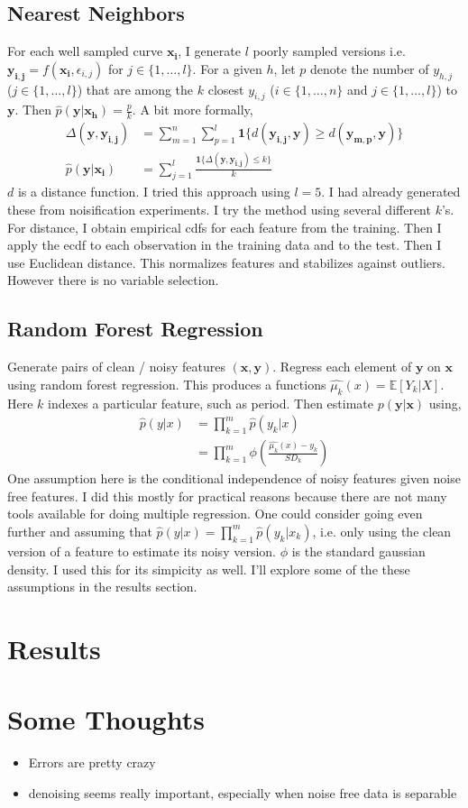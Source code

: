 \documentclass[10pt]{article}
\begin{document}
\subsection{Nearest Neighbors}
For each well sampled curve $\mathbf{x_i}$, I generate $l$ poorly sampled versions i.e. $\mathbf{y_{i,j}} = f(\mathbf{x_i},\epsilon_{i,j})$ for $j \in \{1, \ldots, l\}$. For a given $h$, let $p$ denote the number of $y_{h,j}$ ($j \in \{1, \ldots ,l\}$) that are among the $k$ closest $y_{i,j}$ ($i \in \{1, \ldots ,n\}$ and $j \in \{1, \ldots ,l\}$) to $\mathbf{y}$. Then $\hat{p}(\mathbf{y}|\mathbf{x_h}) = \frac{p}{k}$. A bit more formally,
\begin{align*}
\Delta(\mathbf{y},\mathbf{y_{i,j}}) &= \sum_{m=1}^n \sum_{p=1}^{l} \mathbf{1}\{d(\mathbf{y_{i,j}},\mathbf{y}) \geq d(\mathbf{y_{m,p}},\mathbf{y})\}\\
\hat{p}(\mathbf{y}|\mathbf{x_i}) &= \sum_{j=1}^l \frac{\mathbf{1}\{\Delta(\mathbf{y},\mathbf{y_{i,j}}) \leq k\}}{k}
\end{align*}
$d$ is a distance function. I tried this approach using $l=5$. I had already generated these from noisification experiments. I try the method using several different $k$'s. For distance, I obtain empirical cdfs for each feature from the training. Then I apply the ecdf to each observation in the training data and to the test. Then I use Euclidean distance. This normalizes features and stabilizes against outliers. However there is no variable selection.


\subsection{Random Forest Regression}
Generate pairs of clean / noisy features $(\mathbf{x},\mathbf{y})$. Regress each element of $\mathbf{y}$ on $\mathbf{x}$ using random forest regression. This produces a functions $\hat{\mu_k}(x) = \mathbb{E}[Y_k|X]$. Here $k$ indexes a particular feature, such as period. Then estimate $p(\mathbf{y}|\mathbf{x})$ using,
\begin{align*}
\hat{p}(y | x) &= \prod_{k=1}^m \hat{p}(y_k|x)\\
&=\prod_{k=1}^m \phi \left( \frac{\hat{\mu_k}(x) - y_k} {SD_k}\right)
\end{align*}
One assumption here is the conditional independence of noisy features given noise free features. I did this mostly for practical reasons because there are not many tools available for doing multiple regression. One could consider going even further and assuming that $\hat{p}(y | x) = \prod_{k=1}^m \hat{p}(y_k|x_k)$, i.e. only using the clean version of a feature to estimate its noisy version. $\phi$ is the standard gaussian density. I used this for its simpicity as well. I'll explore some of the these assumptions in the results section.

\section{Results}



\section{Some Thoughts}
\begin{itemize}
\item Errors are pretty crazy
\item denoising seems really important, especially when noise free data is separable
\end{itemize}
\end{document}
